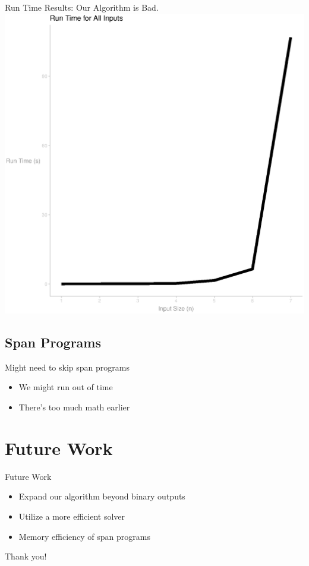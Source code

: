 \documentclass[12pt]{beamer}
\begin{document}
\begin{frame}{Run Time Results: Our Algorithm is Bad.}
\centering
\includegraphics[scale=.5]{figure_all_or_time.eps}
\end{frame}

\subsection{Span Programs}
\begin{frame}{Might need to skip span programs}
\begin{itemize}
    \item We might run out of time
    \item There's too much math earlier
\end{itemize}
    
\end{frame}




\section{Future Work}
\begin{frame}{Future Work}
\begin{itemize}
    \item Expand our algorithm beyond binary outputs
    \item Utilize a more efficient solver
    \item Memory efficiency of span programs
\end{itemize}
\end{frame}

\begin{frame}{Thank you!}


\end{frame}
\end{document}

